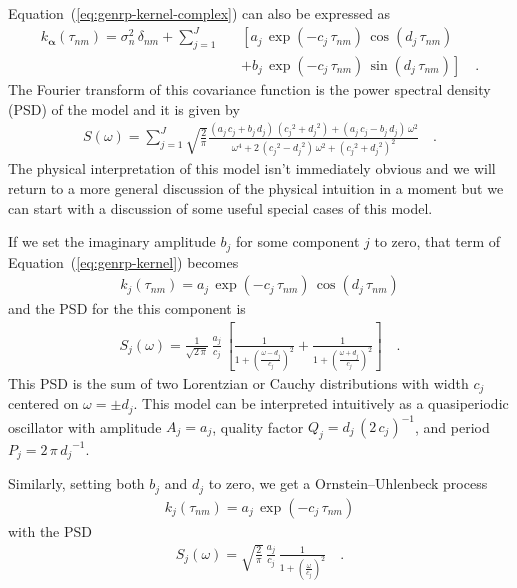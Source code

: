 \documentclass[manuscript, letterpaper]{aastex6}
\renewcommand{\eqref}[1]{\ref{eq:#1}}
\newcommand{\Eq}[1]{Equation~(\eqref{#1})}
\newcommand{\eq}[1]{\Eq{#1}}
\newcommand{\eqlabel}[1]{\label{eq:#1}}
\newcommand{\bvec}[1]{{\ensuremath{\boldsymbol{#1}}}}
\begin{document}
\eq{genrp-kernel-complex} can also be expressed as
\begin{eqnarray}\eqlabel{genrp-kernel}
k_\bvec{\alpha}(\tau_{nm}) = \sigma_n^2\,\delta_{nm} +
    \sum_{j=1}^J &&\left[
    a_j\,\exp\left(-c_j\,\tau_{nm}\right)\,\cos\left(d_j\,\tau_{nm}\right)
        \right.\nonumber\\
    &&+ \left.
    b_j\,\exp\left(-c_j\,\tau_{nm}\right)\,\sin\left(d_j\,\tau_{nm}\right)
\right] \quad.
\end{eqnarray}
The Fourier transform of this covariance function is the power spectral
density (PSD) of the model and it is given by
\begin{eqnarray}\eqlabel{genrp-psd}
S(\omega) = \sum_{j=1}^J \sqrt{\frac{2}{\pi}}
\frac{(a_j\,c_j+b_j\,d_j)\,({c_j}^2+{d_j}^2)+(a_j\,c_j-b_j\,d_j)\,\omega^2}
{\omega^4+2\,({c_j}^2-{d_j}^2)\,\omega^2+({c_j}^2+{d_j}^2)^2}\quad.
\end{eqnarray}
The physical interpretation of this model isn't immediately obvious and we
will return to a more general discussion of the physical intuition in a moment
but we can start with a discussion of some useful special cases of this model.

If we set the imaginary amplitude $b_j$ for some component $j$ to zero, that
term of \eq{genrp-kernel} becomes
\begin{eqnarray}
k_j(\tau_{nm}) =
    a_j\,\exp\left(-c_j\,\tau_{nm}\right)\,\cos\left(d_j\,\tau_{nm}\right)
\end{eqnarray}
and the PSD for the this component is
\begin{eqnarray}\eqlabel{lorentz-psd}
S_j(\omega) = \frac{1}{\sqrt{2\,\pi}}\,\frac{a_j}{c_j}\,\left[
    \frac{1}{1+\left(\frac{\omega-d_j}{c_j}\right)^2} +
    \frac{1}{1+\left(\frac{\omega+d_j}{c_j}\right)^2}
\right] \quad.
\end{eqnarray}
This PSD is the sum of two Lorentzian or Cauchy distributions with width
$c_j$ centered on $\omega = \pm d_j$.
This model can be interpreted intuitively as a quasiperiodic oscillator with
amplitude $A_j = a_j$, quality factor $Q_j = d_j\,(2\,c_j)^{-1}$, and period
$P_j = 2\,\pi\,{d_j}^{-1}$.

Similarly, setting both $b_j$ and $d_j$ to zero, we get a Ornstein--Uhlenbeck
process
\begin{eqnarray}
k_j(\tau_{nm}) = a_j\,\exp\left(-c_j\,\tau_{nm}\right)
\end{eqnarray}
with the PSD
\begin{eqnarray}
S_j(\omega) = \sqrt{\frac{2}{\pi}}\,\frac{a_j}{c_j}\,
    \frac{1}{1+\left(\frac{\omega}{c_j}\right)^2} \quad.
\end{eqnarray}
\end{document}
